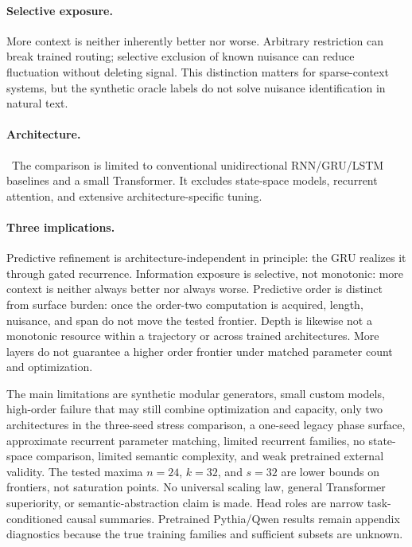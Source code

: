 \documentclass[10pt]{article}
\begin{document}
\paragraph{Selective exposure.} More context is neither inherently better nor worse. Arbitrary restriction can break trained routing; selective exclusion of known nuisance can reduce fluctuation without deleting signal. This distinction matters for sparse-context systems, but the synthetic oracle labels do not solve nuisance identification in natural text.

\paragraph{Architecture.} \RNNAbstract\ The comparison is limited to conventional unidirectional RNN/GRU/LSTM baselines and a small Transformer. It excludes state-space models, recurrent attention, and extensive architecture-specific tuning.

\paragraph{Three implications.} Predictive refinement is architecture-independent in principle: the GRU realizes it through gated recurrence. Information exposure is selective, not monotonic: more context is neither always better nor always worse. Predictive order is distinct from surface burden: once the order-two computation is acquired, length, nuisance, and span do not move the tested frontier. Depth is likewise not a monotonic resource within a trajectory or across trained architectures. More layers do not guarantee a higher order frontier under matched parameter count and optimization.

The main limitations are synthetic modular generators, small custom models, high-order failure that may still combine optimization and capacity, only two architectures in the three-seed stress comparison, a one-seed legacy phase surface, approximate recurrent parameter matching, limited recurrent families, no state-space comparison, limited semantic complexity, and weak pretrained external validity. The tested maxima $n=24$, $k=32$, and $s=32$ are lower bounds on frontiers, not saturation points. No universal scaling law, general Transformer superiority, or semantic-abstraction claim is made. Head roles are narrow task-conditioned causal summaries. Pretrained Pythia/Qwen results remain appendix diagnostics because the true training families and sufficient subsets are unknown.
\end{document}
